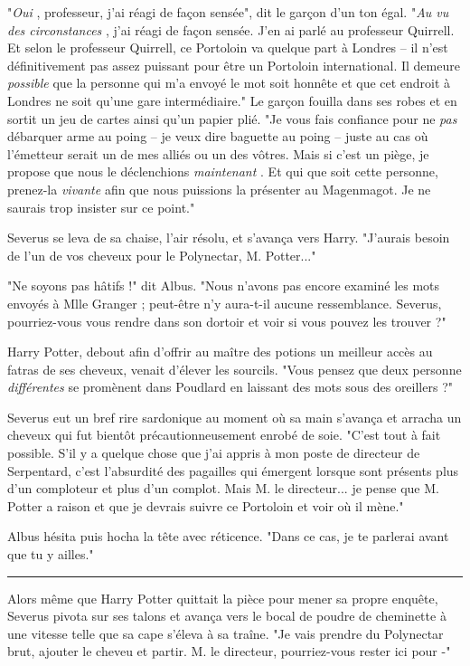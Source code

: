"\emph{Oui} , professeur, j'ai réagi de façon sensée", dit le garçon d'un ton égal. "\emph{Au vu des circonstances} , j'ai réagi de façon sensée. J'en ai parlé au professeur Quirrell. Et selon le professeur Quirrell, ce Portoloin va quelque part à Londres – il n'est définitivement pas assez puissant pour être un Portoloin international. Il demeure \emph{possible } que la personne qui m'a envoyé le mot soit honnête et que cet endroit à Londres ne soit qu'une gare intermédiaire." Le garçon fouilla dans ses robes et en sortit un jeu de cartes ainsi qu'un papier plié. "Je vous fais confiance pour ne \emph{pas}  débarquer arme au poing – je veux dire baguette au poing – juste au cas où l'émetteur serait un de mes alliés ou un des vôtres. Mais si c'est un piège, je propose que nous le déclenchions \emph{maintenant} . Et qui que soit cette personne, prenez-la \emph{vivante}  afin que nous puissions la présenter au Magenmagot. Je ne saurais trop insister sur ce point."

Severus se leva de sa chaise, l'air résolu, et s'avança vers Harry. "J'aurais besoin de l'un de vos cheveux pour le Polynectar, M. Potter..."

"Ne soyons pas hâtifs !" dit Albus. "Nous n'avons pas encore examiné les mots envoyés à Mlle Granger ; peut-être n'y aura-t-il aucune ressemblance. Severus, pourriez-vous vous rendre dans son dortoir et voir si vous pouvez les trouver ?"

Harry Potter, debout afin d'offrir au maître des potions un meilleur accès au fatras de ses cheveux, venait d'élever les sourcils. "Vous pensez que deux personne \emph{différentes}  se promènent dans Poudlard en laissant des mots sous des oreillers ?"

Severus eut un bref rire sardonique au moment où sa main s'avança et arracha un cheveux qui fut bientôt précautionneusement enrobé de soie. "C'est tout à fait possible. S'il y a quelque chose que j'ai appris à mon poste de directeur de Serpentard, c'est l'absurdité des pagailles qui émergent lorsque sont présents plus d'un comploteur et plus d'un complot. Mais M. le directeur... je pense que M. Potter a raison et que je devrais suivre ce Portoloin et voir où il mène."

Albus hésita puis hocha la tête avec réticence. "Dans ce cas, je te parlerai avant que tu y ailles."
\par\noindent\rule{\textwidth}{0.4pt}
Alors même que Harry Potter quittait la pièce pour mener sa propre enquête, Severus pivota sur ses talons et avança vers le bocal de poudre de cheminette à une vitesse telle que sa cape s'éleva à sa traîne. "Je vais prendre du Polynectar brut, ajouter le cheveu et partir. M. le directeur, pourriez-vous rester ici pour -"

